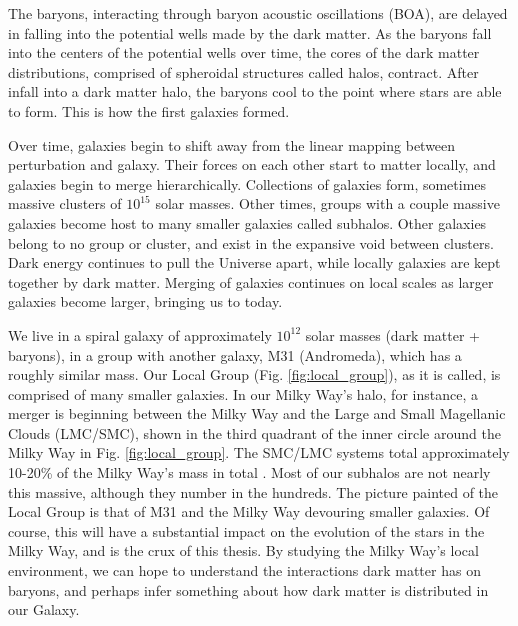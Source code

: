 The baryons, interacting through baryon acoustic oscillations (BOA), are delayed in falling into the potential wells made by the dark matter. As the baryons fall into the centers of the potential wells over time, the cores of the dark matter distributions, comprised of spheroidal structures called halos, contract. After infall into a dark matter halo, the baryons cool to the point where stars are able to form. This is how the first galaxies formed. 

Over time, galaxies begin to shift away from the linear mapping between perturbation and galaxy. Their forces on each other start to matter locally, and galaxies begin to merge hierarchically. Collections of galaxies form, sometimes massive clusters of $10^{15}$ solar masses. Other times, groups with a couple massive galaxies become host to many smaller galaxies called subhalos. Other galaxies belong to no group or cluster, and exist in the expansive void between clusters. Dark energy continues to pull the Universe apart, while locally galaxies are kept together by dark matter. Merging of galaxies continues on local scales as larger galaxies become larger, bringing us to today.

We live in a spiral galaxy of approximately $10^{12}$ solar masses (dark matter + baryons), in a group with another galaxy, M31 (Andromeda), which has a roughly similar mass. Our Local Group (Fig. \ref{fig:local_group}), as it is called, is comprised of many smaller galaxies. In our Milky Way's halo, for instance, a merger is beginning between the Milky Way and the Large and Small Magellanic Clouds (LMC/SMC), shown in the third quadrant of the inner circle around the Milky Way in Fig. \ref{fig:local_group}. The SMC/LMC systems total approximately 10-20\% of the Milky Way's mass in total \citep{erkal_lmc}. Most of our subhalos are not nearly this massive, although they number in the hundreds. The picture painted of the Local Group is that of M31 and the Milky Way devouring smaller galaxies. Of course, this will have a substantial impact on the evolution of the stars in the Milky Way, and is the crux of this thesis. By studying the Milky Way's local environment, we can hope to understand the interactions dark matter has on baryons, and perhaps infer something about how dark matter is distributed in our Galaxy.



